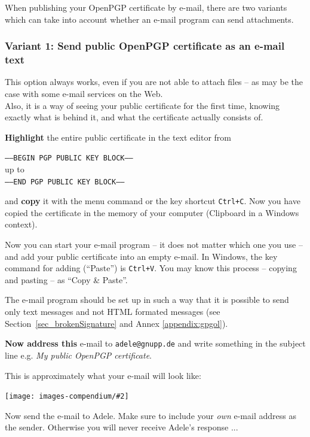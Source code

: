 \documentclass[a4paper,11pt,oneside,openright,titlepage]{scrbook}
\newcommand{\Menu}[1]{\textit{#1}}
\newcommand{\Filename}[1]{\small{\texttt{#1}}\normalsize}
\newcommand{\Email}{e-mail}
\newcommand{\IncludeImage}[2][]{
\begin{center}
  \texttt{[image: images-compendium/\#2]}%
\end{center}
}
\begin{document}
\clearpage
When publishing your OpenPGP certificate by \Email{}, there are
two variants which can take into account whether an
\Email{} program can send attachments.

\subsubsection{Variant 1: Send public OpenPGP certificate as an
\Email{} text}

This option always works, even if you are not able to attach files --
as may be the case with some \Email{} services on the Web.\\ Also,
it is a way of seeing your public certificate for the first time,
knowing exactly what is behind it, and what the certificate actually
consists of.

\textbf{Highlight} the entire public certificate in the text editor from

\Filename{-----BEGIN PGP PUBLIC KEY BLOCK-----}\\
up to\\
\Filename{-----END PGP PUBLIC KEY BLOCK-----}

and \textbf{copy} it with the menu command or the key shortcut
\Filename{Ctrl+C}. Now you have copied the certificate in the memory
of your computer (Clipboard in a Windows context).

Now you can start your \Email{} program -- it does not matter which
one you use -- and add your public certificate into an empty \Email{}.
In Windows, the key command for adding (``Paste'') is
\Filename{Ctrl+V}. You may know this process ­-- copying and pasting
­-- as ``Copy \& Paste''.

The \Email{} program should be set up in such a way that it is
possible to send only text messages and not HTML formated messages
(see Section~\ref{sec_brokenSignature} and Annex
\ref{appendix:gpgol}).

\textbf{Now address this} \Email{} to
\Filename{adele@gnupp.de} and write something in the subject line e.g.
\Menu{My public OpenPGP certificate}.

\clearpage
This is approximately what your \Email{} will look like:

\IncludeImage[width=0.85\textwidth]{sc-ol-adele-sendOpenpgpKey-inline_en}

Now send the \Email{} to Adele. Make sure to include your
\textit{own} \Email{} address as the sender. Otherwise you will never receive Adele's response ...
\end{document}

